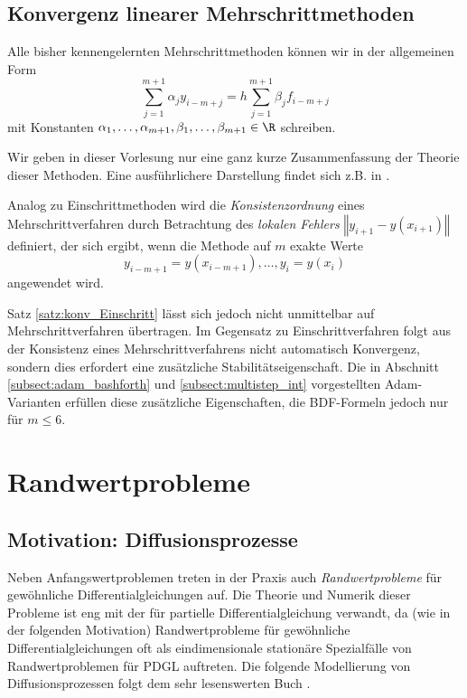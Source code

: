 \documentclass[
]{mycourse}
\theoremstyle{mythm}
\theoremstyle{break}
\newcommand{\norm}[1]{\left\Vert#1\right\Vert}		%
\begin{document}
\subsection{Konvergenz linearer Mehrschrittmethoden}

Alle bisher kennengelernten Mehrschrittmethoden können wir in der allgemeinen Form
\[
\sum_{j=1}^{m+1} \alpha_j  y_{i-m+j} = h \sum_{j=1}^{m+1} \beta_j  f_{i-m+j}
\]
mit Konstanten $\alpha_1,\ldots,\alpha_{m+1},\beta_1,\ldots,\beta_{m+1}\in \R$ schreiben.

Wir geben in dieser Vorlesung nur eine ganz kurze Zusammenfassung der Theorie dieser Methoden.
Eine ausführlichere Darstellung findet sich z.B. in \cite{HairerNorsettWanner}.

Analog zu Einschrittmethoden wird die \emph{Konsistenzordnung} eines Mehrschrittverfahren
durch Betrachtung des \emph{lokalen Fehlers} $\norm{y_{i+1}-y(x_{i+1})}$
definiert, der sich ergibt, wenn die Methode
auf $m$ exakte Werte 
\[
y_{i-m+1}=y(x_{i-m+1}),\ldots,y_{i}=y(x_i)
\]
angewendet wird.

Satz \ref{satz:konv_Einschritt} lässt sich jedoch nicht unmittelbar auf Mehrschrittverfahren
übertragen. Im Gegensatz zu Einschrittverfahren folgt aus der Konsistenz eines Mehrschrittverfahrens
nicht automatisch Konvergenz, sondern dies erfordert eine zusätzliche Stabilitätseigenschaft.
Die in Abschnitt \ref{subsect:adam_bashforth} und \ref{subsect:multistep_int} vorgestellten
Adam-Varianten erfüllen diese zusätzliche Eigenschaften, die BDF-Formeln jedoch nur für
$m\leq 6$.


\section{Randwertprobleme}

\subsection{Motivation: Diffusionsprozesse}
Neben Anfangswertproblemen treten in der Praxis auch \emph{Randwertprobleme} für gewöhnliche Differentialgleichungen auf. Die Theorie und Numerik dieser Probleme ist eng mit der für partielle Differentialgleichung verwandt, da (wie in der folgenden Motivation)  Randwertprobleme für gewöhnliche Differentialgleichungen oft als eindimensionale stationäre Spezialfälle von Randwertproblemen für PDGL auftreten. Die folgende Modellierung
von Diffusionsprozessen folgt dem sehr lesenswerten Buch \cite{FulfordBroadbridge}.
\end{document}
